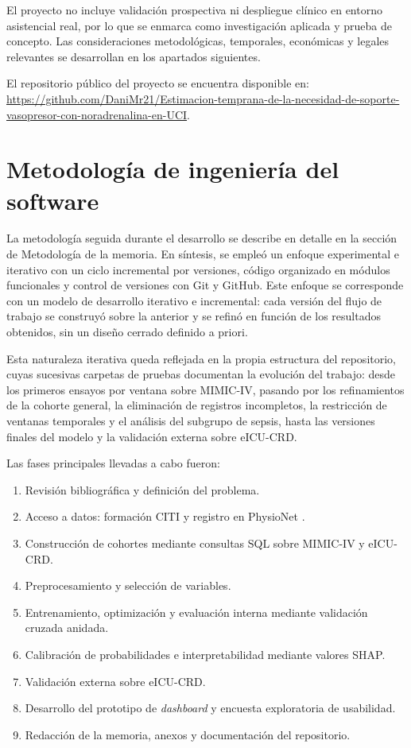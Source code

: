 \documentclass[
  spanish,
  a4paper,
  12pt,
  twoside]{memoir}
\begin{document}
El proyecto no incluye validación prospectiva ni despliegue clínico en entorno asistencial real, por lo que se enmarca como investigación aplicada y prueba de concepto. Las consideraciones metodológicas, temporales, económicas y legales relevantes se desarrollan en los apartados siguientes.

El repositorio público del proyecto se encuentra disponible en: \url{https://github.com/DaniMr21/Estimacion-temprana-de-la-necesidad-de-soporte-vasopresor-con-noradrenalina-en-UCI}.

\section{Metodología de ingeniería del software}

La metodología seguida durante el desarrollo se describe en detalle en la sección de Metodología de la memoria. En síntesis, se empleó un enfoque experimental e iterativo con un ciclo incremental por versiones, código organizado en módulos funcionales y control de versiones con Git y GitHub. Este enfoque se corresponde con un modelo de desarrollo iterativo e incremental: cada versión del flujo de trabajo se construyó sobre la anterior y se refinó en función de los resultados obtenidos, sin un diseño cerrado definido a priori.

Esta naturaleza iterativa queda reflejada en la propia estructura del repositorio, cuyas sucesivas carpetas de pruebas documentan la evolución del trabajo: desde los primeros ensayos por ventana sobre MIMIC-IV, pasando por los refinamientos de la cohorte general, la eliminación de registros incompletos, la restricción de ventanas temporales y el análisis del subgrupo de sepsis, hasta las versiones finales del modelo y la validación externa sobre eICU-CRD.

Las fases principales llevadas a cabo fueron:

\begin{enumerate}
  \item Revisión bibliográfica y definición del problema.
  \item Acceso a datos: formación CITI y registro en PhysioNet \citep{citiprogram,physionet}.
  \item Construcción de cohortes mediante consultas SQL sobre MIMIC-IV y eICU-CRD.
  \item Preprocesamiento y selección de variables.
  \item Entrenamiento, optimización y evaluación interna mediante validación cruzada anidada.
  \item Calibración de probabilidades e interpretabilidad mediante valores SHAP.
  \item Validación externa sobre eICU-CRD.
  \item Desarrollo del prototipo de \textit{dashboard} y encuesta exploratoria de usabilidad.
  \item Redacción de la memoria, anexos y documentación del repositorio.
\end{enumerate}
\end{document}

